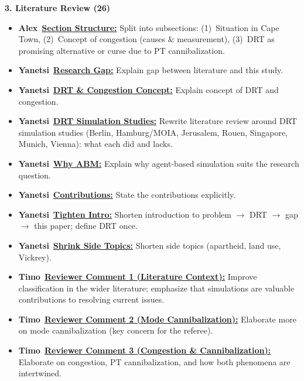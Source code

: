 \documentclass[preprint,12pt,authoryear]{elsarticle}
\newcommand{\todobadge}[2]{\colorbox{#1}{\textbf{\scriptsize #2}}}
\newcommand{\badgeTimo}{\todobadge{orange!30}{Timo}}
\newcommand{\badgeAlex}{\todobadge{blue!25}{Alex}}
\newcommand{\badgeYanetsi}{\todobadge{purple!30}{Yanetsi}}
\begin{document}
\noindent\textbf{3. Literature Review (26)}
\begin{itemize}\setlength{\itemsep}{1pt}\setlength{\parskip}{0pt}\setlength{\parsep}{0pt}
  \item[$\square$] \badgeAlex\ \hyperlink{todo:lit-split}{\textbf{Section Structure:}} Split into subsections: (1)~Situation in Cape Town, (2)~Concept of congestion (causes \& measurement), (3)~DRT as promising alternative or curse due to PT cannibalization.
  \item[$\square$] \badgeYanetsi\ \hyperlink{todo:lit-yanetsi-gap}{\textbf{Research Gap:}} Explain gap between literature and this study.
  \item[$\square$] \badgeYanetsi\ \hyperlink{todo:lit-yanetsi-concept}{\textbf{DRT \& Congestion Concept:}} Explain concept of DRT and congestion.
  \item[$\square$] \badgeYanetsi\ \hyperlink{todo:lit-yanetsi-drt-sims}{\textbf{DRT Simulation Studies:}} Rewrite literature review around DRT simulation studies (Berlin, Hamburg/MOIA, Jerusalem, Rouen, Singapore, Munich, Vienna): what each did and lacks.
  \item[$\square$] \badgeYanetsi\ \hyperlink{todo:lit-yanetsi-abm}{\textbf{Why ABM:}} Explain why agent-based simulation suits the research question.
  \item[$\square$] \badgeYanetsi\ \hyperlink{todo:lit-yanetsi-contrib}{\textbf{Contributions:}} State the contributions explicitly.
  \item[$\square$] \badgeYanetsi\ \hyperlink{todo:lit-yanetsi-intro-short}{\textbf{Tighten Intro:}} Shorten introduction to problem $\rightarrow$ DRT $\rightarrow$ gap $\rightarrow$ this paper; define DRT once.
  \item[$\square$] \badgeYanetsi\ \hyperlink{todo:lit-yanetsi-shrink}{\textbf{Shrink Side Topics:}} Shorten side topics (apartheid, land use, Vickrey).
  \item[$\square$] \badgeTimo\ \hyperlink{todo:lit-rev1}{\textbf{Reviewer Comment 1 (Literature Context):}} Improve classification in the wider literature; emphasize that simulations are valuable contributions to resolving current issues.
  \item[$\square$] \badgeTimo\ \hyperlink{todo:lit-rev2}{\textbf{Reviewer Comment 2 (Mode Cannibalization):}} Elaborate more on mode cannibalization (key concern for the referee).
  \item[$\square$] \badgeTimo\ \hyperlink{todo:lit-rev3}{\textbf{Reviewer Comment 3 (Congestion \& Cannibalization):}} Elaborate on congestion, PT cannibalization, and how both phenomena are intertwined.

\end{itemize}
\end{document}
